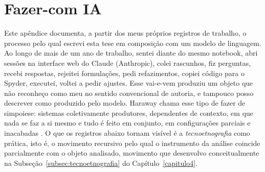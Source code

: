 %
%
%

\chapter{Fazer-com IA}
\label{apendice:colaboracao-ia}

Este apêndice documenta, a partir dos meus próprios registros de trabalho, o processo pelo qual escrevi esta tese em composição com um modelo de linguagem. Ao longo de mais de um ano de trabalho, sentei diante do mesmo notebook, abri sessões na interface web do Claude (Anthropic), colei rascunhos, fiz perguntas, recebi respostas, rejeitei formulações, pedi refazimentos, copiei código para o Spyder, executei, voltei a pedir ajustes. Esse vai-e-vem produziu um objeto que não reconheço como meu no sentido convencional de autoria, e tampouco posso descrever como produzido pelo modelo. Haraway chama esse tipo de fazer de simpoiese: sistemas coletivamente produtores, dependentes de contexto, em que nada se faz a si mesmo e tudo é feito em conjunto, em configurações parciais e inacabadas \parencite{Haraway2016Staying}. O que os registros abaixo tornam visível é a \textit{tecnoetnografia} como prática, isto é, o movimento recursivo pelo qual o instrumento da análise coincide parcialmente com o objeto analisado, movimento que desenvolvo conceitualmente na Subseção~\ref{subsec:tecnoetnografia} do Capítulo~\ref{capitulo4}.

